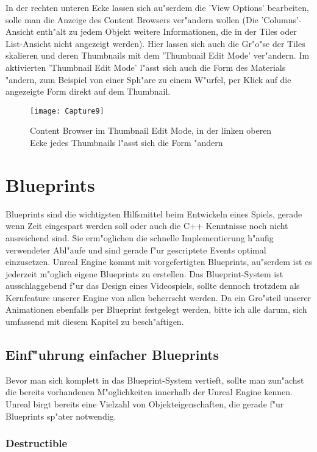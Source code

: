 \documentclass[11pt, titlepage]{article}
\begin{document}
\noindent In der rechten unteren Ecke lassen sich au"serdem die 'View Options' bearbeiten, solle man die Anzeige des Content Browsers ver"andern wollen (Die 'Columns'-Ansicht enth"alt zu jedem Objekt weitere Informationen, die in der Tiles oder List-Ansicht nicht angezeigt werden). Hier lassen sich auch die Gr"o"se der Tiles skalieren und deren Thumbnails mit dem 'Thumbnail Edit Mode' ver"andern. Im aktivierten 'Thumbnail Edit Mode' l"asst sich auch die Form des Materials "andern, zum Beispiel von einer Sph"are zu einem W"urfel, per Klick auf die angezeigte Form direkt auf dem Thumbnail.

\begin{figure}[h]
\texttt{[image: Capture9]}
\caption{Content Browser im Thumbnail Edit Mode, in der linken oberen Ecke jedes Thumbnails l"asst sich die Form "andern}
\end{figure}

\section{Blueprints}

\noindent Blueprints sind die wichtigsten Hilfsmittel beim Entwickeln eines Spiels, gerade wenn Zeit eingespart werden soll oder auch die C++ Kenntnisse noch nicht ausreichend sind. Sie erm"oglichen die schnelle Implementierung h"aufig verwendeter Abl"aufe und sind gerade f"ur gescriptete Events optimal einzusetzen. Unreal Engine kommt mit vorgefertigten Blueprints, au"serdem ist es jederzeit m"oglich eigene Blueprints zu erstellen. Das Blueprint-System ist ausschlaggebend f"ur das Design eines Videospiels, sollte dennoch trotzdem als Kernfeature unserer Engine von allen beherrscht werden. Da ein Gro"steil unserer Animationen ebenfalls per Blueprint festgelegt werden, bitte ich alle darum, sich umfassend mit diesem Kapitel zu besch"aftigen.

\subsection{Einf"uhrung einfacher Blueprints}

\noindent Bevor man sich komplett in das Blueprint-System vertieft, sollte man zun"achst die bereits vorhandenen M"oglichkeiten innerhalb der Unreal Engine kennen. Unreal birgt bereits eine Vielzahl von Objekteigenschaften, die gerade f"ur Blueprints sp"ater notwendig.

\subsubsection{Destructible}
\end{document}
